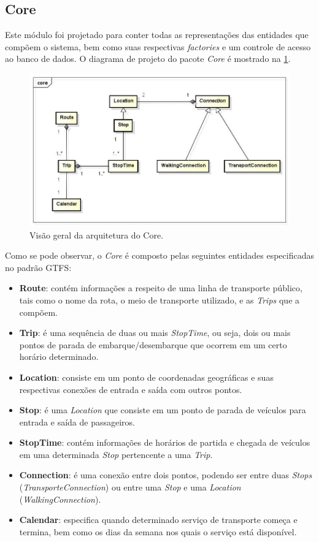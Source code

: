 \subsection{Core}
Este módulo foi projetado para conter todas as representações das entidades que compõem o sistema, bem como suas respectivas \emph{factories} e um controle de acesso ao banco de dados.
O diagrama de projeto do pacote \emph{Core} é mostrado na \ref{fig:core}.

\begin{figure}[!htb]
	\centering
	\includegraphics[width=1\textwidth]{./CoreDiagram.jpg}
	\caption[ImgCore]{Visão geral da arquitetura do Core.}
	\label{fig:core}
\end{figure}

Como se pode observar, o \emph{Core} é composto pelas seguintes entidades especificadas no padrão GTFS:

\begin{itemize}
	\item \textbf{Route}: contém informações a respeito de uma linha de transporte público, tais como o nome da rota, o meio de transporte utilizado, e as \emph{Trips} que a compõem.
	\item \textbf{Trip}: é uma sequência de duas ou mais \emph{StopTime}, ou seja, dois ou mais pontos de parada de embarque/desembarque que ocorrem em um certo horário determinado.
	\item \textbf{Location}: consiste em um ponto de coordenadas geográficas e suas respectivas conexões de entrada e saída com outros pontos.
	\item \textbf{Stop}: é uma \emph{Location} que consiste em um ponto de parada  de veículos para entrada e saída de passageiros.
	\item \textbf{StopTime}: contém informações de horários de partida e chegada de veículos em uma determinada \emph{Stop} pertencente a uma \emph{Trip}.
	\item \textbf{Connection}: é uma conexão entre dois pontos, podendo ser entre duas \emph{Stops} (\emph{TransporteConnection}) ou entre uma \emph{Stop} e uma \emph{Location} (\emph{WalkingConnection}).
	\item \textbf{Calendar}: especifica quando determinado serviço de transporte começa e termina, bem como os dias da semana nos quais o serviço está disponível.
\end{itemize}


